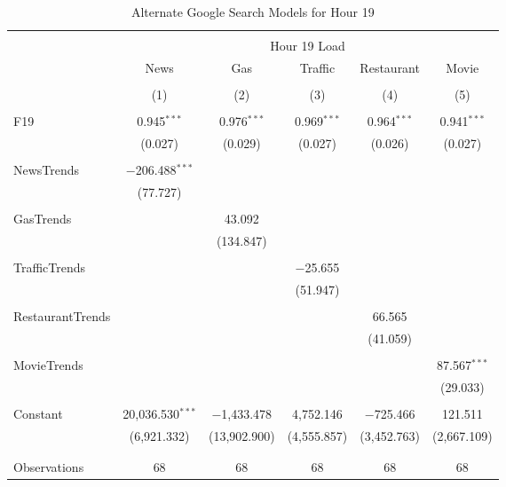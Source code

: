 \documentclass{article}
\begin{document}
\begin{table}[!htbp] \centering 
  \caption{Alternate Google Search Models for Hour 19} 
  \label{} 
\begin{tabular}{@{\extracolsep{5pt}}lccccc} 
\\[-1.8ex]\hline 
\hline \\[-1.8ex] 
 & \multicolumn{5}{c}{Hour 19 Load} \\ 
\cline{2-6} 
 & News & Gas & Traffic & Restaurant & Movie \\ 
\\[-1.8ex] & (1) & (2) & (3) & (4) & (5)\\ 
\hline \\[-1.8ex] 
 F19 & 0.945$^{***}$ & 0.976$^{***}$ & 0.969$^{***}$ & 0.964$^{***}$ & 0.941$^{***}$ \\ 
  & (0.027) & (0.029) & (0.027) & (0.026) & (0.027) \\ 
  & & & & & \\ 
 NewsTrends & $-$206.488$^{***}$ &  &  &  &  \\ 
  & (77.727) &  &  &  &  \\ 
  & & & & & \\ 
 GasTrends &  & 43.092 &  &  &  \\ 
  &  & (134.847) &  &  &  \\ 
  & & & & & \\ 
 TrafficTrends &  &  & $-$25.655 &  &  \\ 
  &  &  & (51.947) &  &  \\ 
  & & & & & \\ 
 RestaurantTrends &  &  &  & 66.565 &  \\ 
  &  &  &  & (41.059) &  \\ 
  & & & & & \\ 
 MovieTrends &  &  &  &  & 87.567$^{***}$ \\ 
  &  &  &  &  & (29.033) \\ 
  & & & & & \\ 
 Constant & 20,036.530$^{***}$ & $-$1,433.478 & 4,752.146 & $-$725.466 & 121.511 \\ 
  & (6,921.332) & (13,902.900) & (4,555.857) & (3,452.763) & (2,667.109) \\ 
  & & & & & \\ 
\hline \\[-1.8ex] 
Observations & 68 & 68 & 68 & 68 & 68 \\ 

\end{tabular}
\end{table}
\end{document}
